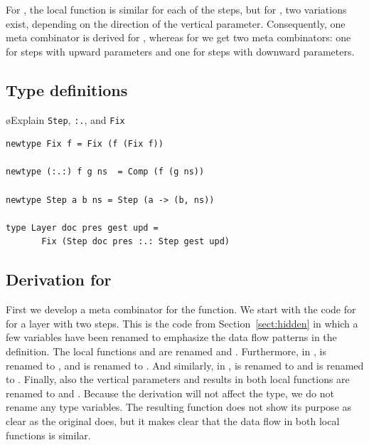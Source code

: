 \documentclass[preprint,natbib]{sigplanconf}
\begin{document}
\bc
 For , the local function is similar for each of the steps, but for , two variations exist, depending on the direction of the vertical parameter. Consequently, one meta combinator is derived for , whereas for  we get two meta combinators: one for steps with upward parameters and one for steps with downward parameters.
\ec
 
 
%																
\subsection{Type definitions} \label{subsecttypedef}

\bl
\o Explain \verb|Step|, \verb|:.|, and \verb|Fix|
\el
\begin{small}
\begin{verbatim}
newtype Fix f = Fix (f (Fix f))

newtype (:.:) f g ns  = Comp (f (g ns))

newtype Step a b ns = Step (a -> (b, ns))

type Layer doc pres gest upd = 
       Fix (Step doc pres :.: Step gest upd)
\end{verbatim}
\end{small}


%																
\subsection{Derivation for }

First we develop a meta combinator for the  function. We start with the code for  for a layer with two steps. This is the code from Section~\ref{sect:hidden} in which a few variables have been renamed to emphasize the data flow patterns in the definition.
\bc The local functions  and  are renamed  and . Furthermore, in ,  is renamed to , and  is renamed to . And similarly, in ,  is renamed to  and  is renamed to . Finally, also the vertical parameters and results in both local functions are renamed to  and . Because the derivation will not affect the type, we do not rename any type variables. The resulting function does not show its purpose as clear as the original does, but it makes clear that the data flow in both local functions is similar. \ec
\end{document}
